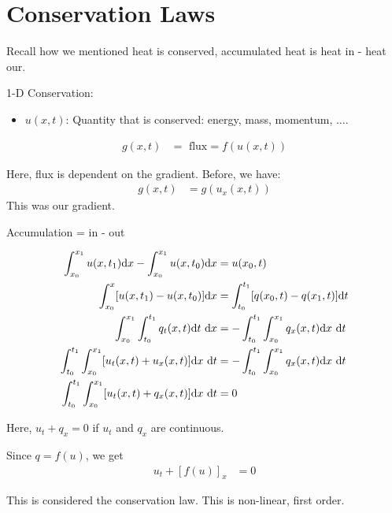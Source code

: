 \newpage
\section{Conservation Laws}

Recall how we mentioned heat is conserved, accumulated heat is heat in - heat our.

1-D Conservation:
\begin{itemize}
  \item $u(x, t)$: Quantity that is conserved: energy, mass, momentum, $\ldots$.
\end{itemize}
  \begin{align}
    g(x, t) & = \text{ flux} = f(u(x, t))
  \end{align}

  Here, flux is dependent on the gradient. Before, we have:
  \begin{align}
    g(x, t) & = g(u_x(x, t))
  \end{align}
  This was our gradient.


  \begin{center}
    Accumulation = in - out
  \end{center}
  \begin{align}
    \int^{x_1}_{x_0} u(x, t_1) \text dx - \int^{x_1}_{x_0} u(x, t_0) \text dx
    & = u(x_0, t)\\
    \int^x_{x_0} [u(x, t_1) - u(x, t_0)] \text dx
    & = \int^{t_1}_{t_0} [ q(x_0, t) - q(x_1, t)] \text dt\\
    \int^{x_1}_{x_0} \int^{t_1}_{t_0} q_t(x, t) \text dt\ \text dx
    & = - \int^{t_1}_{t_0} \int^{x_1}_{x_0} q_x(x, t) \text dx\ \text dt\\
    \int^{t_1}_{t_0} \int^{x_1}_{x_0} [u_t(x, t) + u_x(x, t)] \text dx\ \text dt
    & = -\int^{t_1}_{t_0} \int^{x_1}_{x_0} q_x(x, t) \text dx\ \text dt\\
    \int^{t_1}_{t_0} \int^{x_1}_{x_0} [u_t(x, t) + q_x(x, t)] \text dx\ \text dt & = 0
  \end{align}

  Here, $u_t + q_x = 0$ if $u_t$ and $q_x$ are continuous.

  Since $q = f(u)$, we get
  \begin{align}
    u_t + [f(u)]_x & = 0
  \end{align}

  This is considered the conservation law. This is non-linear, first order.

